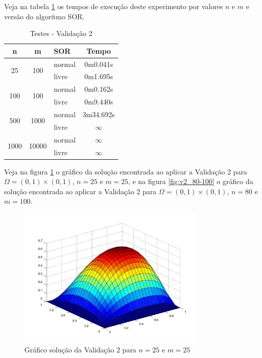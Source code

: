 \documentclass[
	11pt,				%
	oneside,			%
	a4paper,			%
	english,			%
	brazil,				%
	]{article}
\begin{document}
Veja na tabela \ref{tab:tv2} os tempos de execução deste experimento por 
valores $n$ e $m$ e versão do algoritmo SOR.

\begin{table}[ht]
\centering
\begin{tabular}{|c|c|l|c|}
\hline 
\textbf{n} & \textbf{m} & \textbf{SOR} & \textbf{Tempo} \\
\hline
\multirow{2}{*}{25}    & \multirow{2}{*}{100}   & normal & 0m0.041s \\
                       &                        & livre  & 0m1.695s \\
\hline
\multirow{2}{*}{100}   & \multirow{2}{*}{100}   & normal & 0m0.162s \\
                       &                        & livre  & 0m9.440s \\
\hline
\multirow{2}{*}{500}   & \multirow{2}{*}{1000}  & normal & 3m34.692s \\
                       &                        & livre  & $\infty$ \\
\hline
\multirow{2}{*}{1000}  & \multirow{2}{*}{10000} & normal & $\infty$ \\
                       &                        & livre  & $\infty$ \\
\hline
\end{tabular}
\caption{Testes - Validação 2}
\label{tab:tv2}
\end{table}

Veja na figura \ref{fig:v2_25-25} o gráfico da solução encontrada ao aplicar 
a Validação 2 para $\Omega = (0,1)\times(0,1)$, $n = 25$ e $m = 25$, e na 
figura \ref{fig:v2_80-100} o gráfico da solução encontrada ao aplicar 
a Validação 2 para $\Omega = (0,1)\times(0,1)$, $n = 80$ e $m = 100$.

\begin{figure}[h]
    \centering
    \includegraphics[width=0.8\textwidth]{v2_25-25}
    \caption{Gráfico solução da Validação 2 para $n = 25$ e $m = 25$}
    \label{fig:v2_25-25}
\end{figure}
\end{document}

